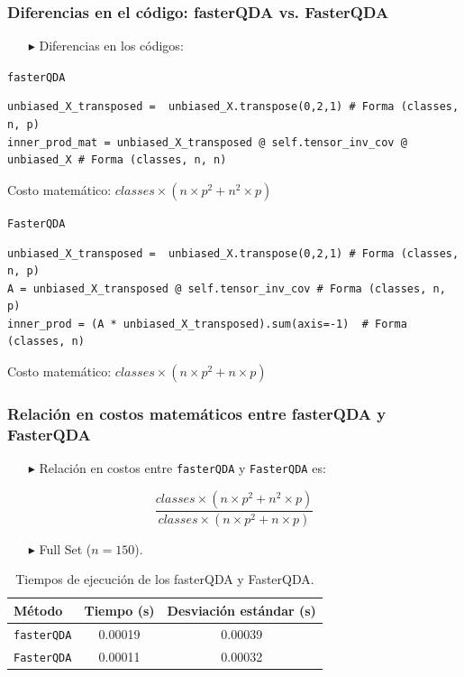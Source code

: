 \begin{frame}[fragile]
  \frametitle{Diferencias en el código: fasterQDA vs. FasterQDA}
  \begin{itemize}
    \item[$\blacktriangleright$] Diferencias en los códigos:
  \end{itemize}

  \begin{block}{\texttt{fasterQDA}}
    \begin{lstlisting}[style=pythonstyle]
unbiased_X_transposed =  unbiased_X.transpose(0,2,1) # Forma (classes, n, p)
inner_prod_mat = unbiased_X_transposed @ self.tensor_inv_cov @ unbiased_X # Forma (classes, n, n)
    \end{lstlisting}
  \end{block}
  Costo matemático: \(classes \times (n \times p^2 + n^2 \times p)\)

  \begin{block}{\texttt{FasterQDA}}
    \begin{lstlisting}[style=pythonstyle]
unbiased_X_transposed =  unbiased_X.transpose(0,2,1) # Forma (classes, n, p)
A = unbiased_X_transposed @ self.tensor_inv_cov # Forma (classes, n, p)
inner_prod = (A * unbiased_X_transposed).sum(axis=-1)  # Forma (classes, n)
    \end{lstlisting}
  \end{block}
  Costo matemático: \(classes \times (n \times p^2 + n \times p)\)

\end{frame}


\begin{frame}[fragile]
    \frametitle{Relación en costos matemáticos entre fasterQDA y FasterQDA}
  \begin{itemize}
    \item[$\blacktriangleright$] Relación en costos entre \texttt{fasterQDA} y \texttt{FasterQDA} es:
  \end{itemize}
  
  \[
    \frac{classes \times (n \times p^2 + n^2 \times p)}{classes \times (n \times p^2 + n \times p)}
  \]

  \begin{itemize}
    \item[$\blacktriangleright$] Full Set ($n=150$).
  \end{itemize}

  \begin{table}[h!]
      \centering
      \begin{tabular}{@{}lcc@{}}
        \toprule
        \textbf{Método}      & Tiempo (s)           & Desviación estándar (s) \\ 
        \midrule
        \texttt{fasterQDA}   & 0.00019              & 0.00039                 \\ 
        \texttt{FasterQDA}   & 0.00011              & 0.00032                 \\ 
        \bottomrule
      \end{tabular}
      \caption{Tiempos de ejecución de los fasterQDA y FasterQDA.}
  \end{table}

\end{frame}

